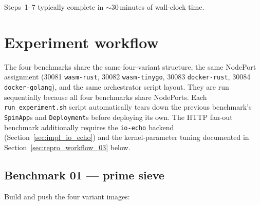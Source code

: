 Steps~1--7 typically complete in ${\sim}30$\,minutes of wall-clock time.

\section{Experiment workflow}
\label{sec:repro_workflow}

\begin{sloppypar}
The four benchmarks share the same four-variant structure, the same NodePort assignment (30081 \texttt{wasm-rust}, 30082 \texttt{wasm-tinygo}, 30083 \texttt{docker-rust}, 30084 \texttt{docker-golang}), and the same orchestrator script layout. They are run sequentially because all four benchmarks share NodePorts. Each \texttt{run\_experiment.sh} script automatically tears down the previous benchmark's \texttt{SpinApp}s and \texttt{Deployment}s before deploying its own. The HTTP fan-out benchmark additionally requires the \texttt{io-echo} backend (Section~\ref{sec:impl_io_echo}) and the kernel-parameter tuning documented in Section~\ref{sec:repro_workflow_03} below.
\end{sloppypar}

\subsection{Benchmark 01 --- prime sieve}
\label{sec:repro_workflow_01}

Build and push the four variant images:

